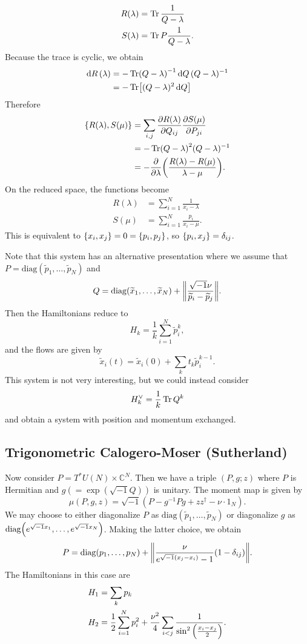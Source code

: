 \documentclass[leqno, openany]{memoir}
\theoremstyle{definition}
\theoremstyle{remark}
\theoremstyle{plain}
\theoremstyle{definition}
\theoremstyle{remark}
\newcommand{\C}{\mathbb{C}}
\newcommand{\mr}[1]{\mathrm{#1}}
\newcommand{\wt}[1]{\widetilde{#1}}
\begin{document}
\begin{align*}
  R(\lambda) &= \Tr \frac{1}{Q-\lambda} \\
  S(\lambda) &= \Tr P \frac{1}{Q-\lambda}.
\end{align*}
Because the trace is cyclic, we obtain
\begin{align*}
  \dd{R}(\lambda) &= -\Tr(Q-\lambda)^{-1} \dd{Q} (Q-\lambda)^{-1} \\
  &= -\Tr [(Q-\lambda)^2 \dd{Q}]
\end{align*}
Therefore
\begin{align*}
  \qty{R(\lambda), S(\mu)} &= \sum_{i,j} \pdv{R(\lambda)}{Q_{ij}} \pdv{S(\mu)}{P_{ji}} \\
                           &= -\Tr (Q-\lambda)^2 (Q-\lambda)^{-1} \\
                           &= -\pdv{\lambda} \qty(\frac{R(\lambda) - R(\mu)}{\lambda - \mu}).
\end{align*}
On the reduced space, the functions become
\begin{align*}
  R(\lambda) &= \sum_{i=1}^N \frac{1}{x_i-\lambda} \\
  S(\mu) &= \sum_{i=1}^N \frac{p_i}{x_i-\mu}.
\end{align*}
This is equivalent to $\qty{x_i, x_j} = 0 = \qty{p_i, p_j}$, so $\qty{p_i, x_j} = \delta_{ij}$.

Note that this system has an alternative presentation where we assume that $P = \mr{diag}(\wt{p}_1, \ldots, \wt{p}_N)$ and
\[ Q = \mr{diag}(\wt{x}_1, \ldots, \wt{x}_N) + \norm{\frac{\sqrt{-1}\nu}{\wt{p}_i - \wt{p}_j}}. \]
Then the Hamiltonians reduce to
\[ H_k = \frac{1}{k} \sum_{i=1}^N \wt{p}_i^k, \]
and the flows are given by
\[ \wt{x}_i(t) = \wt{x}_i(0) + \sum_k t_k \wt{p}_i^{k-1}. \]
This system is not very interesting, but we could instead consider
\[ H_k^{\vee} = \frac{1}{k} \Tr Q^k \]
and obtain a system with position and momentum exchanged.

\subsection{Trigonometric Calogero-Moser (Sutherland)}
\label{sub:trigcm}

Now consider $P = T^* U(N) \times \C^N$. Then we have a triple $(P, g;z)$ where $P$ is Hermitian and $g (= \exp(\sqrt{-1} Q))$ is unitary. The moment map is given by
\[ \mu(P,g,z) = \sqrt{-1} (P-g^{-1}Pg + z z^{\dag} - \nu \cdot 1_N). \]
We may choose to either diagonalize $P$ as $\mr{diag}(\wt{p}_1, \ldots, \wt{p}_N)$ or diagonalize $g$ as $\mr{diag}\qty(e^{\sqrt{-1}x_1}, \ldots, e^{\sqrt{-1}x_N})$. Making the latter choice, we obtain
\[ P = \mr{diag}(p_1, \ldots, p_N) + \norm{\frac{\nu}{e^{\sqrt{-1}(x_j-x_i)}-1}(1-\delta_{ij})}. \]
The Hamiltonians in this case are
\begin{align*}
  H_1 &= \sum_k p_k \\
  H_2 &= \frac{1}{2} \sum_{i=1}^N p_i^2 + \frac{\nu^2}{4} \sum_{i<j} \frac{1}{\sin^2 \qty(\frac{x_i-x_j}{2})}. 
\end{align*}
\end{document}
